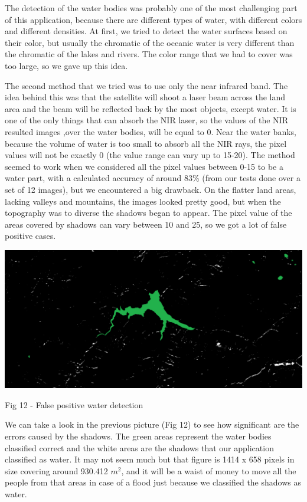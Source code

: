 \documentclass[12pt, a4paper]{report}
\begin{document}
The detection of the water bodies was probably one of the most challenging part of this application, because there are different types of water, with different colors and different densities. At first, we tried to detect the water surfaces based on their color, but usually the chromatic of the oceanic water is very different than the chromatic of the lakes and rivers. The color range that we had to cover was too large, so we gave up this idea. 
\par 
The second method that we tried was to use only the near infrared band. The idea behind this was that the satellite will shoot a laser beam across the land area and the beam will be reflected back by the most objects, except water. It is one of the only things that can absorb the NIR laser, so the values of the NIR resulted images ,over the water bodies, will be equal to 0. Near the water banks, because the volume of water is too small to absorb all the NIR rays, the pixel values will not be exactly 0 (the value range can vary up to 15-20). The method seemed to work when we considered all the pixel values between 0-15 to be a water part, with a calculated accuracy of around 83\% (from our tests done over a set of 12 images), but we encountered a big drawback. On the flatter land areas, lacking valleys and mountains, the images looked pretty good, but when the topography was to diverse the shadows began to appear. The pixel value of the areas covered by shadows can vary between 10 and 25, so we got a lot of false positive cases.

\bigskip
\includegraphics[scale=0.4, left]{water-false-positive.png}
\begin{center}
Fig 12 - False positive water detection
\end{center}
\par 

We can take a look in the previous picture (Fig 12) to see how significant are the errors caused by the shadows. The green areas represent the water bodies classified correct and the white areas are the shadows that our application classified as water. It may not seem much but that figure is 1414 x 658 pixels in size covering around 930.412 $m^2$, and it will be a waist of money to move all the people from that areas in case of a flood just because we classified the shadows as water.
\par 
\end{document}
